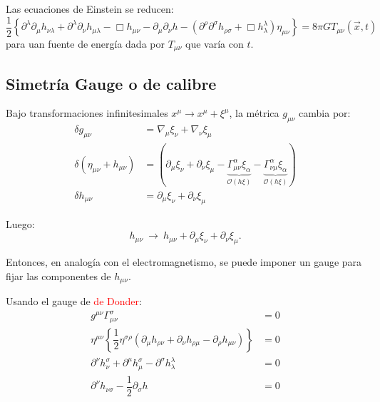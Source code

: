\documentclass[../main]{subfiles}
\begin{document}
\begin{adjustwidth}{0pt}{-100pt}
Las ecuaciones de Einstein se reducen:
\begin{equation}
    \dfrac{1}{2}\left\{\partial^{\lambda}\partial_{\mu}h_{\nu\lambda}+\partial^{\lambda}\partial_{\nu}h_{\mu\lambda}-\Box h_{\mu\nu}-\partial_{\mu}\partial_{\nu}h-(\partial^{\rho}\partial^{\sigma}h_{\rho\sigma}+\Box h^{\lambda}_{\lambda})\eta_{\mu\nu}\right\}=8\pi G T_{\mu\nu}(\vec{x}, t)
\end{equation}
para uan fuente de energía dada por $T_{\mu\nu}$ que varía con $t$.

\subsection{Simetría Gauge o de calibre}

Bajo transformaciones infinitesimales $x^{\mu} \rightarrow x^{\mu}+\xi^{\mu}$, la métrica $g_{\mu\nu}$ cambia por:
\begin{equation}
    \begin{split}
        \delta g_{\mu\nu}&=\nabla_{\mu} \xi_{\nu}+\nabla_{\nu}\xi_{\mu} \\
        \delta(\eta_{\mu\nu}+h_{\mu\nu})&=(\partial_{\mu}\xi_{\nu}+\partial_{\nu}\xi_{\mu}-\underbrace{\Gamma^{\alpha}_{\mu\nu}\xi_{\alpha}}_{\mathcal{O}(h\xi)}-\underbrace{\Gamma^{\alpha}_{\nu\mu}\xi_{\alpha}}_{\mathcal{O}(h\xi)}) \\
        \delta h_{\mu\nu}&=\partial_{\mu} \xi_{\nu}+\partial_{\nu} \xi_{\mu}
    \end{split}
\end{equation}

Luego:
\begin{equation}
    h_{\mu\nu} \ \rightarrow \ h_{\mu\nu}+\partial_{\mu}\xi_{\nu}+\partial_{\nu}\xi_{\mu}.
\end{equation}

Entonces, en analogía con el electromagnetismo, se puede imponer un gauge para fijar las componentes de $h_{\mu\nu}$. 

Usando el gauge de \textcolor{red}{de Donder}:
\begin{equation}
    \begin{split}
        g^{\mu\nu}\Gamma^{\sigma}_{\mu\nu}&=0\\
        \eta^{\mu\nu}\left\{\dfrac{1}{2}\eta^{\sigma\rho}(\partial_{\mu}h_{\rho\nu}+\partial_{\nu}h_{\rho\mu}-\partial_{\rho}h_{\mu\nu})\right\}&=0\\
        \partial^{\nu}h^{\sigma}_{\nu}+\partial^{\mu}h^{\sigma}_{\mu}-\partial^{\sigma}h^{\lambda}_{\lambda}&=0\\
        \partial^{\nu}h_{\nu\sigma}-\dfrac{1}{2}\partial_{\sigma}h&=0
    \end{split}
\end{equation}


\end{adjustwidth}
\end{document}
